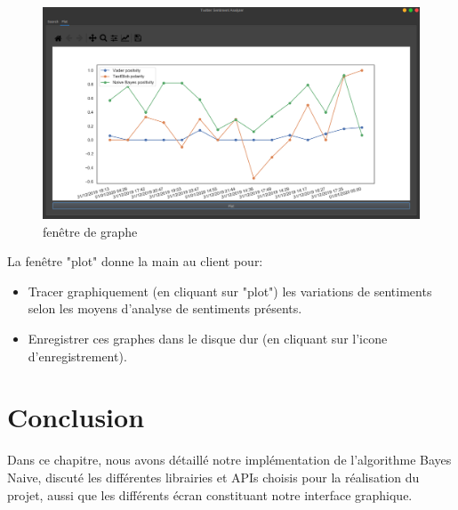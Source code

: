 \begin{figure}
    \centering
    \includegraphics[width=\textwidth]{realisation/assets/2.png}
    \caption{fenêtre de graphe}
    \label{fig:uiplotscreen}
\end{figure}
La fenêtre "plot" donne la main au client pour:
\begin{itemize}
    \item Tracer graphiquement (en cliquant sur "plot") les variations de sentiments selon les moyens d'analyse de sentiments présents.
    \item Enregistrer ces graphes dans le disque dur (en cliquant sur l'icone d'enregistrement).
\end{itemize}

\section{Conclusion}
Dans ce chapitre, nous avons détaillé notre implémentation de l'algorithme Bayes Naive, discuté les différentes librairies et APIs choisis pour la réalisation du projet, aussi que les différents écran constituant notre interface graphique.